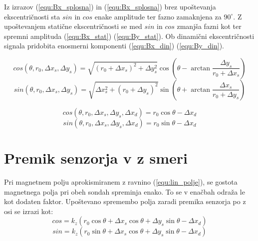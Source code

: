 Iz izrazov (\ref{equ:Bx_splosna}) in (\ref{equ:Bx_splosna}) brez upoštevanja ekscentričnosti sta $sin$ in $cos$ enake amplitude ter fazno zamaknjena za $90^\circ$. Z upoštevanjem statične ekscentričnosti se med $sin$ in $cos$ zmanjša fazni kot ter spremni amplituda (\ref{equ:Bx_stat}) (\ref{equ:By_stat}). Ob dinamični ekscentričnosti signala pridobita enosmerni komponenti (\ref{equ:Bx_din}) (\ref{equ:By_din}).


\begin{equation}
\label{equ:Bx_stat}
cos(\theta,r_0,\Delta x_s, \Delta y_s)= \sqrt{(r_0+\Delta x_s)^2+\Delta y_s^2}\cos(\theta -\arctan \frac{\Delta y_s}{r_0+\Delta x_s})
\end{equation}
\begin{equation}\label{equ:By_stat}
sin(\theta,r_0,\Delta x_s, \Delta y_s)= \sqrt{\Delta x_s^2+(r_0+\Delta y_s)^2} \sin(\theta +\arctan \frac{\Delta x_s}{r_0+\Delta y_s})
\end{equation}


\begin{equation}
\label{equ:Bx_din}
cos(\theta,r_0,\Delta x_s, \Delta y_s, \Delta x_d)= r_0 \cos\theta-\Delta x_d
\end{equation}
\begin{equation}
\label{equ:By_din}
sin(\theta,r_0,\Delta x_s, \Delta y_s, \Delta x_d)= r_0 \sin\theta-\Delta x_d
\end{equation}
\section{Premik senzorja v z smeri}

Pri magnetnem polju aprokismiranem z ravnino (\ref{equ:lin_polje}), se gostota magnetnega polja pri obeh sondah spreminja enako. To se v enačbah odraža le kot dodaten faktor. Upoštevano spremembo polja zaradi premika senzorja po z osi se izrazi kot:
\begin{equation}\label{equ:Bx_z}
cos=k_z( r_0 \cos\theta +\Delta x_s \cos\theta +\Delta y_s \sin\theta -\Delta x_d)
\end{equation}
\begin{equation}\label{equ:By_z}
sin=k_z( r_0 \sin\theta +\Delta x_s \cos\theta +\Delta y_s \sin\theta-\Delta x_d)
\end{equation}

